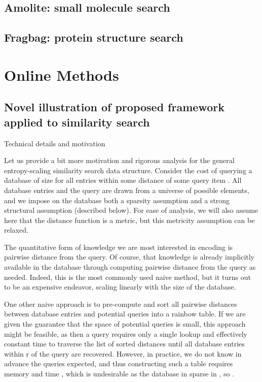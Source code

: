 \documentclass{amsbook}
\theoremstyle{definition}
\theoremstyle{remark}
\numberwithin{equation}{section}
\begin{document}
\section{Amolite: small molecule search}

\section{Fragbag: protein structure search}

\chapter{Online Methods}

\section{Novel illustration of proposed framework applied to similarity search}

Technical details and motivation

Let us provide a bit more motivation and rigorous analysis for the general entropy-scaling similarity search data structure.
Consider the cost of querying a database of size  for all entries within some distance  of some query item .
All database entries and the query are drawn from a universe  of possible elements, and we impose on the database both a sparsity assumption and a strong structural assumption (described below).
For ease of analysis, we will also assume here that the distance function is a metric, but this metricity assumption can be relaxed.

The quantitative form of knowledge we are most interested in encoding is pairwise distance from the query.
Of course, that knowledge is already implicitly available in the database through computing pairwise distance from the query as needed.
Indeed, this is the most commonly used naive method, but it turns out to be an expensive endeavor, scaling linearly with the size of the database.

One other naive approach is to pre-compute and sort all pairwise distances between database entries and potential queries into a rainbow table.
If we are given the guarantee that the space of potential queries is small, this approach might be feasible, as then a query requires only a single lookup and effectively constant time to traverse the list of sorted distances until all database entries within r of the query are recovered.
However, in practice, we do not know in advance the queries expected, and thus constructing such a table requires memory  and time , which is undesirable as the database in sparse in , so .
\end{document}
